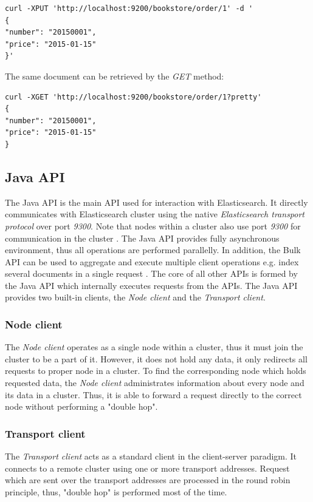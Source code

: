 \documentclass[12pt,oneside]{fithesis2}
\begin{document}
\begin{lstlisting}[caption = Example of indexing data in Elasticsearch, label = elastic_xput]
curl -XPUT 'http://localhost:9200/bookstore/order/1' -d '
{ 
"number": "20150001", 
"price": "2015-01-15"
}'
\end{lstlisting}

The same document can be retrieved by the \textit{GET} method:
\begin{lstlisting}[caption = Example of retrieving data from Elasticsearch, label = elastic_xget]
curl -XGET 'http://localhost:9200/bookstore/order/1?pretty'
{ 
"number": "20150001", 
"price": "2015-01-15"
}
\end{lstlisting}

\subsection{Java API}
The Java API is the main API used for interaction with Elasticsearch. It directly communicates with Elasticsearch cluster using the native \textit{Elasticsearch transport protocol} over port \textit{9300}. Note that nodes within a cluster also use port \textit{9300} for communication in the cluster \cite[Talking to Elasticsearch]{elasticsearch_defnitive_guide}. The Java API provides fully asynchronous environment, thus all operations are performed parallelly. In addition, the Bulk API can be used to aggregate and execute multiple client operations e.g. index several documents in a single request \cite[Java API]{elasticsearch_java_api_doc}. The core of all other APIs \cite{elasticsearch_doc} is formed by the Java API which internally executes requests from the APIs. The Java API provides two built-in clients, the \textit{Node client} and the \textit{Transport client}.

\subsubsection{Node client}
The \textit{Node client} operates as a single node within a cluster, thus it must join the cluster to be a part of it. However, it does not hold any data, it only redirects all requests to proper node in a cluster. To find the corresponding node which holds requested data, the \textit{Node client} administrates information about every node and its data in a cluster. Thus, it is able to forward a request directly to the correct node without performing a "double hop".

\subsubsection{Transport client}
The \textit{Transport client} acts as a standard client in the client-server paradigm. It connects to a remote cluster using one or more transport addresses. Request which are sent over the transport addresses are processed in the round robin principle, thus, "double hop" is performed most of the time.
\end{document}
